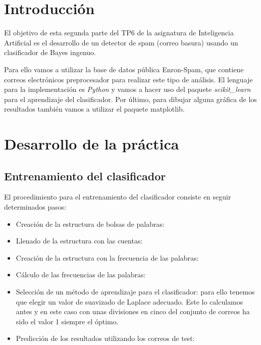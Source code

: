 

\section{Introducci\'on}
El objetivo de esta segunda parte del TP6 de la asignatura de Inteligencia
Artificial es el desarrollo de un detector de spam (correo basura) usando
un clasificador de Bayes ingenuo.

Para ello vamos a utilizar la base de datos p\'ublica Enron-Spam, que contiene
correos electr\'onicos preprocesador para realizar este tipo de an\'alisis.
El lenguaje para la implementaci\'on es \textit{Python} y vamos a hacer uso del
paquete \textit{scikit\_learn} para el aprendizaje del clasificador.
Por \'ultimo, para dibujar alguna gr\'afica de los resultados tambi\'en vamos
a utilizar el paquete matplotlib.

\section{Desarrollo de la pr\'actica}

\subsection{Entrenamiento del clasificador}
El procedimiento para el entrenamiento del clasificador consiste en seguir
determinados pasos:
\begin{itemize}
	\item Creaci\'on de la estructura de bolsas de palabras:
	\item Llenado de la estructura con las cuentas:
	\item Creaci\'on de la estructura con la frecuencia de las palabras:
	\item C\'alculo de las frecuencias de las palabras:
	\item Selecci\'on de un m\'etodo de aprendizaje para el clasificador:
	para ello tenemos que elegir un valor de suavizado de Laplace adecuado.
	Este lo calculamos antes y en este caso con unas divisiones en cinco del
	conjunto de correos ha sido el valor 1 siempre el \'optimo.
	\item Predicci\'on de los resultados utilizando los correos de test:
\end{itemize}

